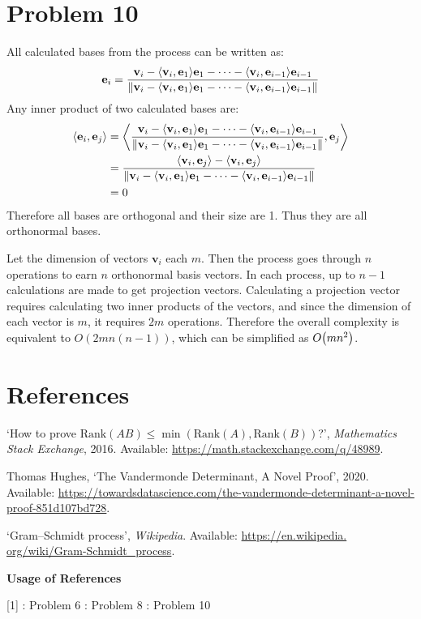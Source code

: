 \documentclass[10pt]{article}
\begin{document}
\section*{Problem 10}
All calculated bases from the process can be written as:
$$\mathbf{e}_i = \frac{\mathbf{v}_i - \langle\mathbf{v}_i, \mathbf{e}_1\rangle\mathbf{e}_1 - \cdots - \langle\mathbf{v}_i, \mathbf{e}_{i-1}\rangle\mathbf{e}_{i-1}}{\norm{\mathbf{v}_i - \langle\mathbf{v}_i, \mathbf{e}_1\rangle\mathbf{e}_1 - \cdots - \langle\mathbf{v}_i, \mathbf{e}_{i-1}\rangle\mathbf{e}_{i-1}}}$$
Any inner product of two calculated bases are:
\begin{align*}
    \langle\mathbf{e}_i, \mathbf{e}_j\rangle &= \left\langle\frac{\mathbf{v}_i - \langle\mathbf{v}_i, \mathbf{e}_1\rangle\mathbf{e}_1 - \cdots - \langle\mathbf{v}_i, \mathbf{e}_{i-1}\rangle\mathbf{e}_{i-1}}{\norm{\mathbf{v}_i - \langle\mathbf{v}_i, \mathbf{e}_1\rangle\mathbf{e}_1 - \cdots - \langle\mathbf{v}_i, \mathbf{e}_{i-1}\rangle\mathbf{e}_{i-1}}}, \mathbf{e}_j\right\rangle \\
    &= \frac{\langle\mathbf{v}_i, \mathbf{e}_j\rangle - \langle\mathbf{v}_i, \mathbf{e}_j\rangle}{\norm{\mathbf{v}_i - \langle\mathbf{v}_i, \mathbf{e}_1\rangle\mathbf{e}_1 - \cdots - \langle\mathbf{v}_i, \mathbf{e}_{i-1}\rangle\mathbf{e}_{i-1}}} \\
    &= 0
\end{align*}
Therefore all bases are orthogonal and their size are 1. Thus they are all orthonormal bases.
\vspace{2mm}

Let the dimension of vectors $\mathbf{v}_i$ each $m$. 
Then the process goes through $n$ operations to earn $n$ orthonormal basis vectors.
In each process, up to $n-1$ calculations are made to get projection vectors. 
Calculating a projection vector requires calculating two inner products of the vectors, and since the dimension of each vector is $m$, it requires $2m$ operations.
Therefore the overall complexity is equivalent to $O(2mn(n-1))$, which can be simplified as $O\qty(mn^2)$.


\section*{References}
\begin{enumerate}[leftmargin=*, label={[\arabic*]}]
    \item `How to prove $\text{Rank}(AB)\leq \min(\text{Rank}(A), \text{Rank}(B))$?', \textit{Mathematics Stack Exchange}, 2016. Available: \url{https://math.stackexchange.com/q/48989}.
    \item Thomas Hughes, `The Vandermonde Determinant, A Novel Proof', 2020. Available: \url{https://towardsdatascience.com/the-vandermonde-determinant-a-novel-proof-851d107bd728}.
    \item `Gram–Schmidt process', \textit{Wikipedia}. Available: \url{https://en.wikipedia. org/wiki/Gram-Schmidt_process}.
\end{enumerate}

\vspace{0.3cm}
\textbf{Usage of References}

\vspace{0.2cm}
[1] : Problem 6 \newline
[2] : Problem 8 \newline
[3] : Problem 10
\end{document}
